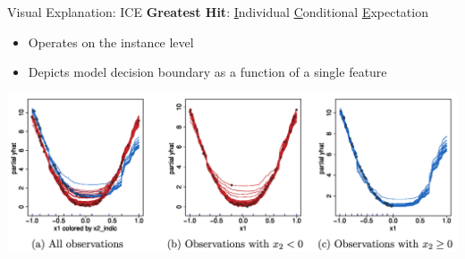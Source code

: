 \documentclass[11pt,dvipsnames,usenames,aspectratio=169]{beamer}  %
\begin{document}
\begin{frame}{Visual Explanation: ICE}
      \textbf{Greatest Hit}: \underline{I}ndividual \underline{C}onditional \underline{E}xpectation~\citep{Goldstein:2015}

      \begin{itemize}
        \setlength{\itemsep}{10pt}
        \item Operates on the instance level
        \item Depicts model decision boundary as a function of a single feature
      \end{itemize}

      \vspace{8pt}
      \begin{center}
        \includegraphics[scale=0.2]{ice_plots.png}
      \end{center}
\end{frame}
\end{document}
